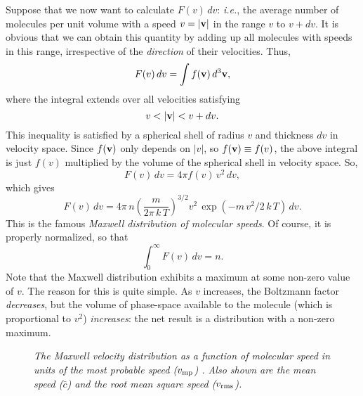 Suppose that we now want to calculate $F(v)\, dv$:
{\em i.e.},  the average number of molecules
per unit volume with a speed $v=|{\bf v}|$ in the range $v$ to $v+dv$. It is
obvious that we can obtain this quantity by adding up all molecules with speeds
in this range, irrespective of the {\em direction}\/ of their velocities. Thus,
\begin{equation}
F(v)\,dv = \int f({\bf v})\, d^3{\bf v},
\end{equation}
where the integral extends over all velocities satisfying
\begin{equation}
v < |{\bf v}| < v + dv.
\end{equation}
This inequality is satisfied by  a spherical shell of radius $v$ and thickness $dv$
in velocity space. Since $f({\bf v})$ only depends on $|v|$,
so $f({\bf  v})\equiv f(v)$,  the above
integral is just $f(v)$ multiplied by the volume of the spherical shell in
velocity space. So,
\begin{equation}
F(v)\, dv = 4\pi f(v) \,v^2\,dv,
\end{equation}
which gives
\begin{equation}
F(v)\,dv = 4\pi\, n\left(\frac{m}{2\pi\, k\,T}\right)^{3/2} v^2\,\exp(-m\,v^2/2\,k\,T)\,dv.
\end{equation}
This is  the famous {\em  Maxwell distribution of molecular speeds}.
Of course, it is properly normalized, so that
\begin{equation}
\int_0^\infty F(v)\,dv = n.
\end{equation}
 Note that the Maxwell
distribution exhibits  a maximum at some non-zero value of $v$. The reason for
this is quite simple. As $v$ increases, the Boltzmann factor {\em decreases},
but the volume of phase-space available to the molecule (which is
proportional to $v^2$) {\em increases}: the net result is a distribution
with a non-zero maximum.

\begin{figure}[ht]
\epsfysize=3in
\centerline{}
\caption{\em The Maxwell velocity  distribution as a function
of molecular speed in units of the most probable speed ($v_{\rm mp}$)
. Also shown are the
mean speed ($\bar{c}$) and the root mean square speed
($v_{\rm rms}$).}\label{fmax}
\end{figure}

